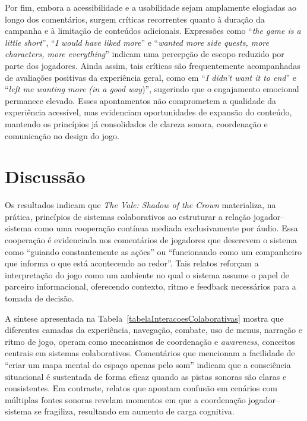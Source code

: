 \documentclass[12pt]{article}
\begin{document}
{{Por fim, embora a acessibilidade e a usabilidade sejam amplamente elogiadas ao longo dos comentários, surgem críticas recorrentes quanto à duração da campanha e à limitação de conteúdos adicionais. Expressões como “\textit{the game is a little short}”, “\textit{I would have liked more}” e “\textit{wanted more side quests, more characters, more everything}” indicam uma percepção de escopo reduzido por parte dos jogadores. Ainda assim, tais críticas são frequentemente acompanhadas de avaliações positivas da experiência geral, como em “\textit{I didn’t want it to end}” e “\textit{left me wanting more (in a good way})”, sugerindo que o engajamento emocional permanece elevado. Esses apontamentos não comprometem a qualidade da experiência acessível, mas evidenciam oportunidades de expansão do conteúdo, mantendo os princípios já consolidados de clareza sonora, coordenação e comunicação no design do jogo.

\section{Discussão}

Os resultados indicam que \textit{The Vale: Shadow of the Crown} materializa, na prática, princípios de sistemas colaborativos ao estruturar a relação jogador–sistema como uma cooperação contínua mediada exclusivamente por áudio. Essa cooperação é evidenciada nos comentários de jogadores que descrevem o sistema como “guiando constantemente as ações” ou “funcionando como um companheiro que informa o que está acontecendo ao redor”. Tais relatos reforçam a interpretação do jogo como um ambiente no qual o sistema assume o papel de parceiro informacional, oferecendo contexto, ritmo e feedback necessários para a tomada de decisão.

A síntese apresentada na Tabela~\ref{tabelaInteracoesColaborativas} mostra que diferentes camadas da experiência, navegação, combate, uso de menus, narração e ritmo de jogo, operam como mecanismos de coordenação e \textit{awareness}, conceitos centrais em sistemas colaborativos. Comentários que mencionam a facilidade de “criar um mapa mental do espaço apenas pelo som” indicam que a consciência situacional é sustentada de forma eficaz quando as pistas sonoras são claras e consistentes. Em contraste, relatos que apontam confusão em cenários com múltiplas fontes sonoras revelam momentos em que a coordenação jogador–sistema se fragiliza, resultando em aumento de carga cognitiva.

}}
\end{document}
